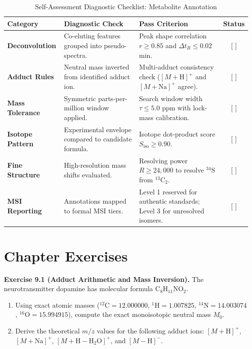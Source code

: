 \documentclass[11pt,twoside,openright]{book}
\begin{document}
\begin{table}[ht]
\centering
\caption{Self-Assessment Diagnostic Checklist: Metabolite Annotation}
\label{tab:diagnostic_checklist}
\small
\begin{tabularx}{\textwidth}{l p{5.5cm} X c}
\toprule
\textbf{Category} & \textbf{Diagnostic Check} & \textbf{Pass Criterion} & \textbf{Status} \\
\midrule
\textbf{Deconvolution} & Co-eluting features grouped into pseudo-spectra. & Peak shape correlation $r \ge 0.85$ and $\Delta t_R \le 0.02$ min. & [ ] \\
\addlinespace
\textbf{Adduct Rules} & Neutral mass inverted from identified adduct ion. & Multi-adduct consistency check ($[M+\text{H}]^+$ and $[M+\text{Na}]^+$ agree). & [ ] \\
\addlinespace
\textbf{Mass Tolerance} & Symmetric parts-per-million window applied. & Search window width $\tau \le 5.0$ ppm with lock-mass calibration. & [ ] \\
\addlinespace
\textbf{Isotope Pattern} & Experimental envelope compared to candidate formula. & Isotope dot-product score $S_{\text{iso}} \ge 0.90$. & [ ] \\
\addlinespace
\textbf{Fine Structure} & High-resolution mass shifts evaluated. & Resolving power $R \ge 24,000$ to resolve $^{34}\text{S}$ from $^{13}\text{C}_2$. & [ ] \\
\addlinespace
\textbf{MSI Reporting} & Annotations mapped to formal MSI tiers. & Level 1 reserved for authentic standards; Level 3 for unresolved isomers. & [ ] \\
\bottomrule
\end{tabularx}
\end{table}

\FloatBarrier

\section{Chapter Exercises}

\noindent\textbf{Exercise 9.1 (Adduct Arithmetic and Mass Inversion).}\enspace
The neurotransmitter dopamine has molecular formula $\text{C}_8\text{H}_{11}\text{NO}_2$.
\begin{enumerate}
    \item Using exact atomic masses ($^{12}\text{C} = 12.000000$, $^{1}\text{H} = 1.007825$, $^{14}\text{N} = 14.003074$, $^{16}\text{O} = 15.994915$), compute the exact monoisotopic neutral mass $M_0$.
    \item Derive the theoretical $m/z$ values for the following adduct ions: $[M+\text{H}]^+$, $[M+\text{Na}]^+$, $[M+\text{H}-\text{H}_2\text{O}]^+$, and $[M-\text{H}]^-$.
\end{enumerate}
\end{document}
